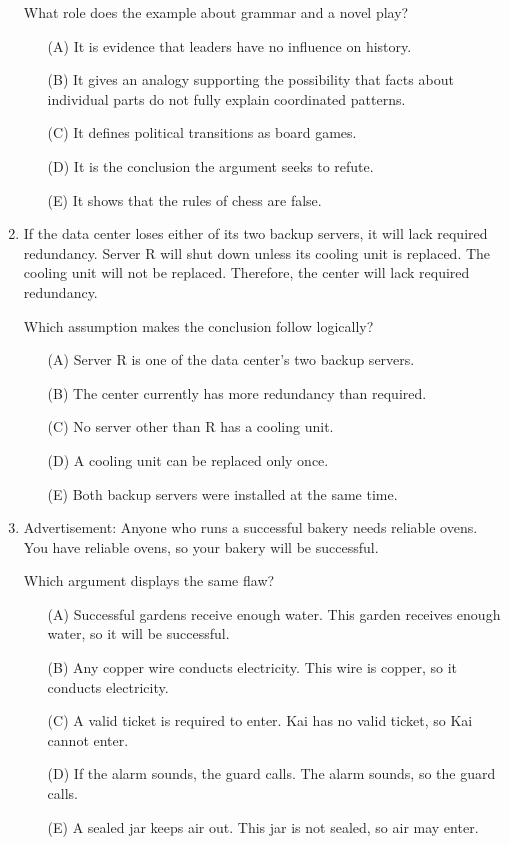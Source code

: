 \begin{enumerate}
What role does the example about grammar and a novel play?
\begin{enumerate}
\item[(A)] It is evidence that leaders have no influence on history.
\item[(B)] It gives an analogy supporting the possibility that facts about individual parts do not fully explain coordinated patterns.
\item[(C)] It defines political transitions as board games.
\item[(D)] It is the conclusion the argument seeks to refute.
\item[(E)] It shows that the rules of chess are false.
\end{enumerate}

\item If the data center loses either of its two backup servers, it will lack required redundancy. Server R will shut down unless its cooling unit is replaced. The cooling unit will not be replaced. Therefore, the center will lack required redundancy.

Which assumption makes the conclusion follow logically?
\begin{enumerate}
\item[(A)] Server R is one of the data center's two backup servers.
\item[(B)] The center currently has more redundancy than required.
\item[(C)] No server other than R has a cooling unit.
\item[(D)] A cooling unit can be replaced only once.
\item[(E)] Both backup servers were installed at the same time.
\end{enumerate}

\item Advertisement: Anyone who runs a successful bakery needs reliable ovens. You have reliable ovens, so your bakery will be successful.

Which argument displays the same flaw?
\begin{enumerate}
\item[(A)] Successful gardens receive enough water. This garden receives enough water, so it will be successful.
\item[(B)] Any copper wire conducts electricity. This wire is copper, so it conducts electricity.
\item[(C)] A valid ticket is required to enter. Kai has no valid ticket, so Kai cannot enter.
\item[(D)] If the alarm sounds, the guard calls. The alarm sounds, so the guard calls.
\item[(E)] A sealed jar keeps air out. This jar is not sealed, so air may enter.
\end{enumerate}


\end{enumerate}
